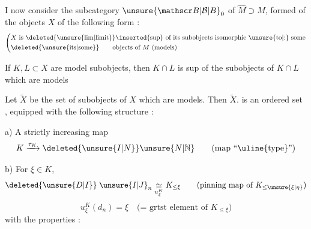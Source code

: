 I now consider the subcategory $ {\unsure{\mathscr B|\mathcal B|B}}_0$ of $\widehat M\supset M$, formed of the objects $X$ of the following form :
\[
\left(\begin{aligned}
&X\text{ is }\deleted{\text{\unsure{lim|limit}}}\inserted{\text{sup}}\text{ of its subobjects isomorphic \unsure{to|:} some}\\
&\deleted{\text{\unsure{its|some}}}\qquad\text{objects of }M\text{ (models)}
\end{aligned}\right.
\]

If $K,L\subset X$ are model subobjects, then $K\cap L$ is sup of the subobjects of $K\cap L$ which are models

Let  $\widetilde X$ be the set of  subobjects of $X$ which are models. Then $\widetilde X$. is an ordered set , equipped with the following structure  : 

a)  A strictly increasing map
\[
K\xrightarrow{\tau_K}\deleted{\unsure{I|N}}\unsure{N|\mathbb N}
\qquad\text{(map ``\uline{type}'')}
\]

b) For  $\xi\in K$,    
\[
\deleted{\unsure{D|I}}\;{\unsure{I|J}}_n\underset{u_\xi^K}{\simeq}K_{\leq\xi}
\qquad\text{(pinning map of }K_{\leq\unsure{\xi|\eta}}\text{)}
\]
\[
u_\xi^K(d_n)=\xi\quad\text{(= grtst element of }K_{\leq\xi}\text{)}
\]
with  the properties  :
